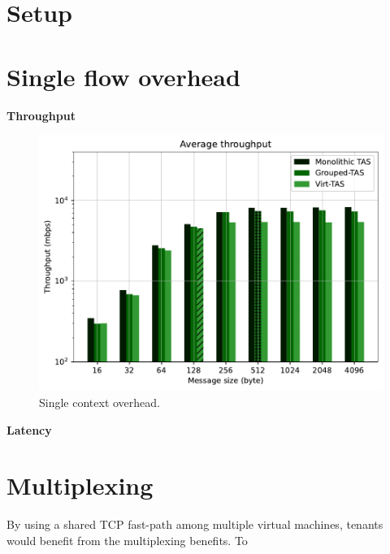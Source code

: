 \section{Setup}

\section{Single flow overhead}

\textbf{Throughput}

\begin{figure}
    \centering
    \includegraphics[scale=0.8]{../results/overhead.throughput.pdf}
    \caption{Single context overhead.}
    \label{fig:overhead.throughput}
\end{figure}

\textbf{Latency}





\section{Multiplexing}
By using a shared TCP fast-path among multiple virtual machines, tenants would benefit from the 
multiplexing benefits. To 

